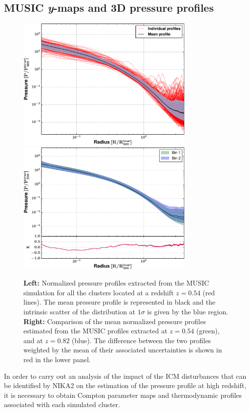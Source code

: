 \documentclass[twocolumn,traditabstract]{aa}
\begin{document}
\subsection{MUSIC \emph{y}-maps and 3D pressure profiles}\label{subsec:music_products}

\begin{figure}[h!]
\centering
\includegraphics[height=6.6cm]{MUSIC_individuals_bin1.pdf}
\hspace{0.6cm}
\includegraphics[height=6.6cm]{MUSIC_compare_bin1_bin2.pdf}
\caption{{\footnotesize \textbf{Left:} Normalized pressure profiles extracted from the MUSIC simulation for all the clusters located at a redshift $z=0.54$ (red lines). The mean pressure profile is represented in black and the intrinsic scatter of the distribution at $1\sigma$ is given by the blue region. \textbf{Right:} Comparison of the mean normalized pressure profiles estimated from the MUSIC profiles extracted at $z=0.54$ (green), and at $z=0.82$ (blue). The difference between the two profiles weighted by the mean of their associated uncertainties is shown in red in the lower panel.}}
\label{fig:MUSIC_P_profiles}
\end{figure}

In order to carry out an analysis of the impact of the ICM disturbances that can be identified by NIKA2 on the estimation of the pressure profile at high redshift, it is necessary to obtain Compton parameter maps and thermodynamic profiles associated with each simulated cluster.\\
\end{document}

